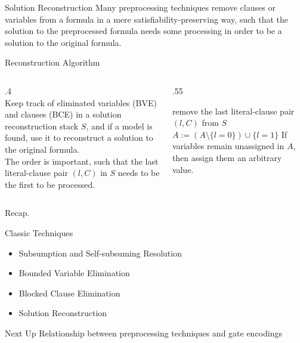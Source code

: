 \documentclass[t]{sdqbeamer}
\begin{document}
\begin{frame}{Solution Reconstruction}
Many preprocessing techniques remove clauses or variables from a formula in a mere satisfiability-preserving way, such that the solution to the preprocessed formula needs some processing in order to be a solution to the original formula.\\[1ex]
\begin{blueblock}{Reconstruction Algorithm}
\begin{columns}[T]
\begin{column}{.4\linewidth}
~\\
Keep track of eliminated variables (BVE) and clauses (BCE) in a solution reconstruction stack $S$, and if a model is found, use it to reconstruct a solution to the original formula.\\[1ex]
The order is important, such that the last literal-clause pair $(l,C)$ in $S$ needs to be the first to be processed.\\[1ex]
\end{column}
\begin{column}{.55\linewidth}
\begin{algorithm}[H]
\caption{Solution Reconstruction}
 {
    remove the last literal-clause pair $(l,C)$ from $S$\;
     {
        $A := (A \setminus \{l = 0\}) \cup \{l = 1\}$
    }
}
\BlankLine
If variables remain unassigned in $A$, then assign them an arbitrary value.
\end{algorithm}
\end{column}
\end{columns}
\end{blueblock}
\end{frame}


\begin{frame}{Recap.}
\begin{block}{Classic Techniques}
\begin{itemize}\setlength{\itemsep}{1ex}
    \item Subsumption and Self-subsuming Resolution
    \item Bounded Variable Elimination
    \item Blocked Clause Elimination
    \item Solution Reconstruction
\end{itemize}
\end{block}
\begin{block}{Next Up}
Relationship between preprocessing techniques and gate encodings
\end{block}
\end{frame}
\end{document}
